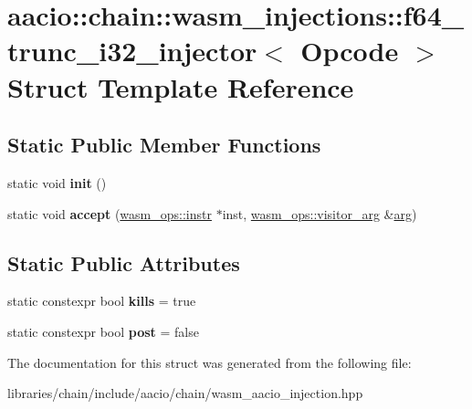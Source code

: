 \hypertarget{structaacio_1_1chain_1_1wasm__injections_1_1f64__trunc__i32__injector}{}\section{aacio\+:\+:chain\+:\+:wasm\+\_\+injections\+:\+:f64\+\_\+trunc\+\_\+i32\+\_\+injector$<$ Opcode $>$ Struct Template Reference}
\label{structaacio_1_1chain_1_1wasm__injections_1_1f64__trunc__i32__injector}
\subsection*{Static Public Member Functions}
\begin{DoxyCompactItemize}
\item 
\mbox{\label{structaacio_1_1chain_1_1wasm__injections_1_1f64__trunc__i32__injector_a3de3127effc04f5e4ac22b911fa93df7}} 
static void {\bfseries init} ()
\item 
\mbox{\label{structaacio_1_1chain_1_1wasm__injections_1_1f64__trunc__i32__injector_a87b5d84b5bdb9474341825b060c67232}} 
static void {\bfseries accept} (\mbox{\hyperlink{structaacio_1_1chain_1_1wasm__ops_1_1instr}{wasm\+\_\+ops\+::instr}} $\ast$inst, \mbox{\hyperlink{structaacio_1_1chain_1_1wasm__ops_1_1visitor__arg}{wasm\+\_\+ops\+::visitor\+\_\+arg}} \&\mbox{\hyperlink{unionarg}{arg}})
\end{DoxyCompactItemize}
\subsection*{Static Public Attributes}
\begin{DoxyCompactItemize}
\item 
\mbox{\label{structaacio_1_1chain_1_1wasm__injections_1_1f64__trunc__i32__injector_a90fdb08823a64ae9c61c286205b24698}} 
static constexpr bool {\bfseries kills} = true
\item 
\mbox{\label{structaacio_1_1chain_1_1wasm__injections_1_1f64__trunc__i32__injector_a2defac9726f74ab357ebce13050e4d6f}} 
static constexpr bool {\bfseries post} = false
\end{DoxyCompactItemize}


The documentation for this struct was generated from the following file\+:\begin{DoxyCompactItemize}
\item 
libraries/chain/include/aacio/chain/wasm\+\_\+aacio\+\_\+injection.\+hpp\end{DoxyCompactItemize}
